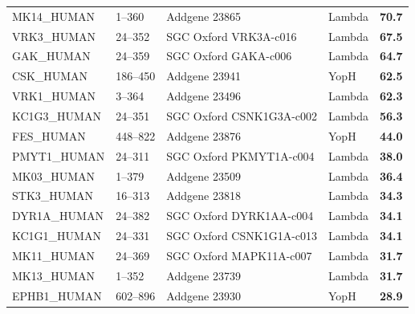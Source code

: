 \documentclass[phd,tocprelim]{cornell}
\begin{document}
\begin{landscape}
\begin{longtable}[c]{lllll}
		MK14\_HUMAN & 1--360& Addgene 23865&	Lambda                    & \cellcolor{forestgreen!55}\bf{70.7}                            \\
		VRK3\_HUMAN & 24--352&SGC Oxford	VRK3A-c016 & Lambda                    & \cellcolor{forestgreen!55}\bf{67.5}                            \\
		GAK\_HUMAN  & 24--359& SGC Oxford GAKA-c006 & Lambda                    & \cellcolor{forestgreen!55}\bf{64.7}                            \\
		CSK\_HUMAN  & 186--450& Addgene	23941 & YopH         & \cellcolor{forestgreen!55}\bf{62.5}                            \\
		VRK1\_HUMAN & 3--364& Addgene	23496 & Lambda                    & \cellcolor{forestgreen!55}\bf{62.3}                            \\
		KC1G3\_HUMAN & 24--351 & SGC Oxford CSNK1G3A-c002 & Lambda                    & \cellcolor{forestgreen!55}\bf{56.3}                            \\
		FES\_HUMAN  & 448--822 & Addgene 23876 & YopH         & \cellcolor{forestgreen!55}\bf{44.0}                            \\
		PMYT1\_HUMAN & 24--311& SGC Oxford	PKMYT1A-c004 & Lambda                    & \cellcolor{forestgreen!55}\bf{38.0}                            \\
		MK03\_HUMAN  & 1--379 & Addgene	23509 &Lambda                    & \cellcolor{forestgreen!55}\bf{36.4}                            \\
		STK3\_HUMAN  &16--313 & Addgene	23818 & Lambda                    & \cellcolor{forestgreen!55}\bf{34.3}                            \\
		DYR1A\_HUMAN & 24--382& SGC Oxford	DYRK1AA-c004 & Lambda                    & \cellcolor{forestgreen!55}\bf{34.1}                            \\
		KC1G1\_HUMAN & 24--331& SGC Oxford	CSNK1G1A-c013 & Lambda                    & \cellcolor{forestgreen!55}\bf{34.1}                            \\
		MK11\_HUMAN  & 24--369 & SGC Oxford	MAPK11A-c007 & Lambda                    & \cellcolor{forestgreen!55}\bf{31.7}                            \\
		MK13\_HUMAN  &1--352 & Addgene 23739&Lambda                    & \cellcolor{forestgreen!55}\bf{31.7}                            \\
		EPHB1\_HUMAN & 602--896& Addgene 23930& YopH         & \cellcolor{forestgreen!55}\bf{28.9}                            \\

\end{longtable}
\end{landscape}
\end{document}

